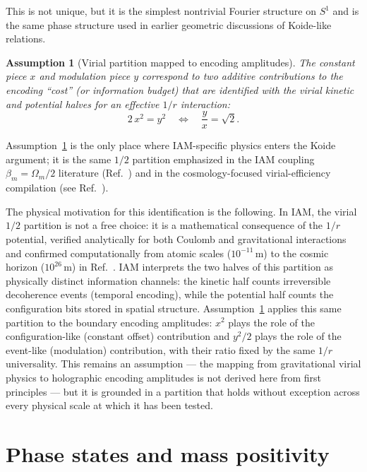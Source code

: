 \documentclass[12pt,a4paper]{article}
\newtheorem{assumption}{Assumption}
\begin{document}
This is not unique, but it is the simplest nontrivial Fourier structure on $S^1$ and is the same phase structure used in earlier geometric discussions of Koide-like relations.

\begin{assumption}[Virial partition mapped to encoding amplitudes]
\label{ass:virialmap}
The constant piece $x$ and modulation piece $y$ correspond to two additive contributions to the encoding ``cost'' (or information budget) that are identified with the virial kinetic and potential halves for an effective $1/r$ interaction:
\begin{equation}
2\,x^2 = y^2 \quad\Longleftrightarrow\quad \frac{y}{x}=\sqrt{2}.
\end{equation}
\end{assumption}

Assumption~\ref{ass:virialmap} is the only place where IAM-specific physics enters the Koide argument; it is the same $1/2$ partition emphasized in the IAM coupling $\beta_m=\Omega_m/2$ literature (Ref.~\cite{virial_paper}) and in the cosmology-focused virial-efficiency compilation (see Ref.~\cite{virial_eff_paper}).

The physical motivation for this identification is the following.
In IAM, the virial $1/2$ partition is not a free choice: it is a mathematical consequence of the $1/r$ potential, verified analytically for both Coulomb and gravitational interactions and confirmed computationally from atomic scales ($10^{-11}$\,m) to the cosmic horizon ($10^{26}$\,m) in Ref.~\cite{virial_paper}.
IAM interprets the two halves of this partition as physically distinct information channels: the kinetic half counts irreversible decoherence events (temporal encoding), while the potential half counts the configuration bits stored in spatial structure.
Assumption~\ref{ass:virialmap} applies this same partition to the boundary encoding amplitudes: $x^2$ plays the role of the configuration-like (constant offset) contribution and $y^2/2$ plays the role of the event-like (modulation) contribution, with their ratio fixed by the same $1/r$ universality.
This remains an assumption --- the mapping from gravitational virial physics to holographic encoding amplitudes is not derived here from first principles --- but it is grounded in a partition that holds without exception across every physical scale at which it has been tested.

\section{Phase states and mass positivity}
\label{sec:positivity}
\end{document}
